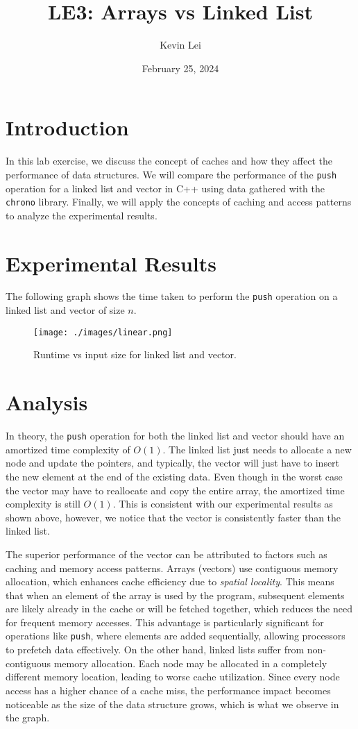 \documentclass{article}
\title{LE3: Arrays vs Linked List}
\author{Kevin Lei}
\date{February 25, 2024}
\begin{document}
\maketitle

\section{Introduction}
In this lab exercise, we discuss the concept of caches and how they affect the performance of data structures. 
We will compare the performance of the \texttt{push} operation for a linked list and vector in C++ using data gathered with the \texttt{chrono} library.
Finally, we will apply the concepts of caching and access patterns to analyze the experimental results.

\section{Experimental Results}
The following graph shows the time taken to perform the \texttt{push} operation on a linked list and vector of size $n$.
\begin{figure}[H]
    \centering
    \texttt{[image: ./images/linear.png]}
    \caption{Runtime vs input size for linked list and vector.}
\end{figure}

\section{Analysis}
In theory, the \texttt{push} operation for both the linked list and vector should have an amortized time complexity of $O(1)$.
The linked list just needs to allocate a new node and update the pointers, and typically, the vector will just have to insert the new element at the end of the existing data.
Even though in the worst case the vector may have to reallocate and copy the entire array, the amortized time complexity is still $O(1)$.
This is consistent with our experimental results as shown above, however, we notice that the vector is consistently faster than the linked list.

The superior performance of the vector can be attributed to factors such as caching and memory access patterns. 
Arrays (vectors) use contiguous memory allocation, which enhances cache efficiency due to \textit{spatial locality}. 
This means that when an element of the array is used by the program, subsequent elements are likely already in the cache or will be fetched together, which reduces the need for frequent memory accesses. 
This advantage is particularly significant for operations like \texttt{push}, where elements are added sequentially, allowing processors to prefetch data effectively.
On the other hand, linked lists suffer from non-contiguous memory allocation. 
Each node may be allocated in a completely different memory location, leading to worse cache utilization. 
Since every node access has a higher chance of a cache miss, the performance impact becomes noticeable as the size of the data structure grows, which is what we observe in the graph.
\end{document}
